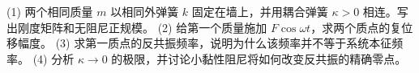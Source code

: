 (1) 两个相同质量 \(m\) 以相同外弹簧 \(k\) 固定在墙上，并用耦合弹簧 \(\kappa>0\) 相连。写出刚度矩阵和无阻尼正规模。
(2) 给第一个质量施加 \(F\cos\omega t\)，求两个质点的复位移幅度。
(3) 求第一质点的反共振频率，说明为什么该频率并不等于系统本征频率。
(4) 分析 \(\kappa\to0\) 的极限，并讨论小黏性阻尼将如何改变反共振的精确零点。
